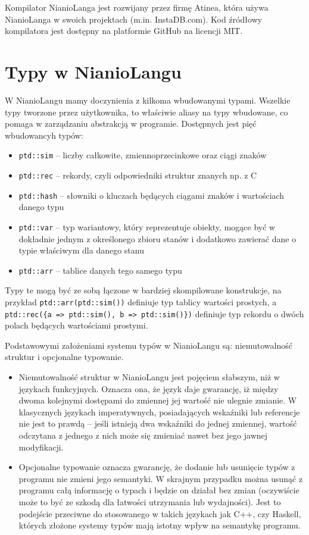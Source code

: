 \documentclass[licencjacka]{pracamgr}
\begin{document}
Kompilator NianioLanga jest rozwijany przez firmę Atinea, która używa NianioLanga w swoich projektach (m.in. InstaDB.com).
Kod źródłowy kompilatora jest dostępny na platformie GitHub\cite{github_repo_nianiolang_original} na licencji MIT.

\section{Typy w NianioLangu}
W NianioLangu mamy doczynienia z kilkoma wbudowanymi typami. Wszelkie typy tworzone przez użytkownika, to właściwie aliasy na typy wbudowane,
co pomaga w zarządzaniu abstrakcją w programie. Dostępnych jest pięć wbudowancyh typów: 
\begin{itemize}
  \item \texttt{ptd::sim} -- liczby całkowite, zmiennoprzecinkowe oraz ciągi znaków
  \item \texttt{ptd::rec} -- rekordy, czyli odpowiedniki struktur znanych np. z C
  \item \texttt{ptd::hash} -- słowniki o kluczach będących ciągami znaków i wartościach danego typu
  \item \texttt{ptd::var} -- typ wariantowy, który reprezentuje obiekty, mogące być w dokładnie jednym z określonego zbioru stanów i dodatkowo
  zawierać dane o typie właściwym dla danego stanu
  \item \texttt{ptd::arr} -- tablice danych tego samego typu
\end{itemize}

Typy te mogą być ze sobą łączone w bardziej skompilowane konstrukcje, na przykład \texttt{ptd::arr(ptd::sim())} definiuje
typ tablicy wartości prostych, a \texttt{ptd::rec(\{a => ptd::sim(), b => ptd::sim()\})} definiuje typ rekordu o dwóch polach będących wartościami prostymi.

Podstawowymi założeniami systemu typów w NianioLangu są: niemutowalność struktur i opcjonalne typowanie.

\begin{itemize}
 \item Niemutowalność struktur w NianioLangu jest pojęciem słabszym, niż w językach funkcyjnych. Oznacza ona,
 że język daje gwarancję, iż między dwoma kolejnymi dostępami do zmiennej jej wartość nie ulegnie zmianie.
 W klasycznych językach imperatywnych, posiadających wskaźniki lub referencje nie jest to prawdą -- jeśli istnieją dwa wskaźniki
 do jednej zmiennej, wartość odczytana z jednego z nich może się zmieniać nawet bez jego jawnej modyfikacji.
 \item Opcjonalne typowanie oznacza gwarancję, że dodanie lub usunięcie typów z programu nie zmieni jego semantyki.
 W skrajnym przypadku można usunąć z programu całą informację o typach i będzie on działał bez zmian
 (oczywiście może to być ze szkodą dla łatwości utrzymania lub wydajności). Jest to podejście przeciwne do stosowanego
 w takich językach jak C++, czy Haskell, których złożone systemy typów mają istotny wpływ na semantykę programu.
\end{itemize}
\end{document}
